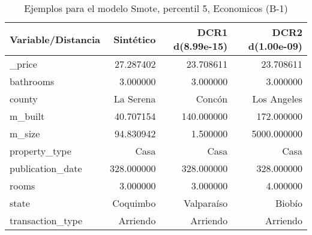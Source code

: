 \begin{table}[H]
\centering
\fontsize{10}{14}\selectfont
\caption{Ejemplos para el modelo Smote, percentil 5, Economicos (B-1)}
\label{table-example-economicos-b-1-smote-enc-5p}
\begin{tabular}{|l|r|r|r|}
\hline
\rowcolor[gray]{0.8}
Variable/Distancia & Sintético & DCR1 d(8.99e-15) & DCR2 d(1.00e-09) \\
\hline \_price & \cellcolor[rgb]{0.9, 0.54, 0.52} 27.287402 & 23.708611 & 23.708611 \\
\hline bathrooms & \cellcolor[rgb]{0.9, 0.54, 0.52} 3.000000 & \cellcolor[rgb]{0.9, 0.54, 0.52} 3.000000 & \cellcolor[rgb]{0.9, 0.54, 0.52} 3.000000 \\
\hline county & \cellcolor[rgb]{0.9, 0.54, 0.52} La Serena & Concón & Los Angeles \\
\hline m\_built & \cellcolor[rgb]{0.9, 0.54, 0.52} 40.707154 & 140.000000 & 172.000000 \\
\hline m\_size & \cellcolor[rgb]{0.9, 0.54, 0.52} 94.830942 & 1.500000 & 5000.000000 \\
\hline property\_type & \cellcolor[rgb]{0.9, 0.54, 0.52} Casa & \cellcolor[rgb]{0.9, 0.54, 0.52} Casa & \cellcolor[rgb]{0.9, 0.54, 0.52} Casa \\
\hline publication\_date & \cellcolor[rgb]{0.9, 0.54, 0.52} 328.000000 & \cellcolor[rgb]{0.9, 0.54, 0.52} 328.000000 & \cellcolor[rgb]{0.9, 0.54, 0.52} 328.000000 \\
\hline rooms & \cellcolor[rgb]{0.9, 0.54, 0.52} 3.000000 & \cellcolor[rgb]{0.9, 0.54, 0.52} 3.000000 & 4.000000 \\
\hline state & \cellcolor[rgb]{0.9, 0.54, 0.52} Coquimbo & Valparaíso & Biobío \\
\hline transaction\_type & \cellcolor[rgb]{0.9, 0.54, 0.52} Arriendo & \cellcolor[rgb]{0.9, 0.54, 0.52} Arriendo & \cellcolor[rgb]{0.9, 0.54, 0.52} Arriendo \\
\hline
\end{tabular}
\end{table}
